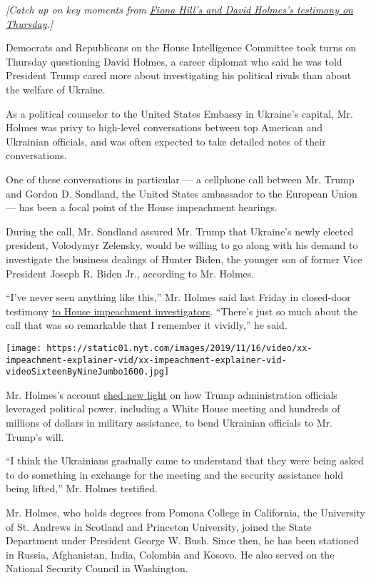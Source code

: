 \emph{{[}Catch up on key moments from}
\href{https://www.nytimes.com/2019/11/21/us/politics/impeachment-hearing.html}{\emph{Fiona
Hill's and David Holmes's testimony on Thursday}}\emph{.{]}}

Democrats and Republicans on the House Intelligence Committee took turns
on Thursday questioning David Holmes, a career diplomat who said he was
told President Trump cared more about investigating his political rivals
than about the welfare of Ukraine.

As a political counselor to the United States Embassy in Ukraine's
capital, Mr. Holmes was privy to high-level conversations between top
American and Ukrainian officials, and was often expected to take
detailed notes of their conversations.

One of these conversations in particular --- a cellphone call between
Mr. Trump and Gordon D. Sondland, the United States ambassador to the
European Union --- has been a focal point of the House impeachment
hearings.

During the call, Mr. Sondland assured Mr. Trump that Ukraine's newly
elected president, Volodymyr Zelensky, would be willing to go along with
his demand to investigate the business dealings of Hunter Biden, the
younger son of former Vice President Joseph R. Biden Jr., according to
Mr. Holmes.

``I've never seen anything like this,'' Mr. Holmes said last Friday in
closed-door testimony
\href{https://www.nytimes.com/2019/11/15/us/politics/trump-ambassador-sondland-ukraine-call.html}{to
House impeachment investigators}. ``There's just so much about the call
that was so remarkable that I remember it vividly,'' he said.

\texttt{[image: https://static01.nyt.com/images/2019/11/16/video/xx-impeachment-explainer-vid/xx-impeachment-explainer-vid-videoSixteenByNineJumbo1600.jpg]}

Mr. Holmes's account
\href{https://www.nytimes.com/2019/11/15/us/politics/trump-ambassador-sondland-ukraine-call.html}{shed
new light} on how Trump administration officials leveraged political
power, including a White House meeting and hundreds of millions of
dollars in military assistance, to bend Ukrainian officials to Mr.
Trump's will.

``I think the Ukrainians gradually came to understand that they were
being asked to do something in exchange for the meeting and the security
assistance hold being lifted,'' Mr. Holmes testified.

Mr. Holmes, who holds degrees from Pomona College in California, the
University of St. Andrews in Scotland and Princeton University, joined
the State Department under President George W. Bush. Since then, he has
been stationed in Russia, Afghanistan, India, Colombia and Kosovo. He
also served on the National Security Council in Washington.

